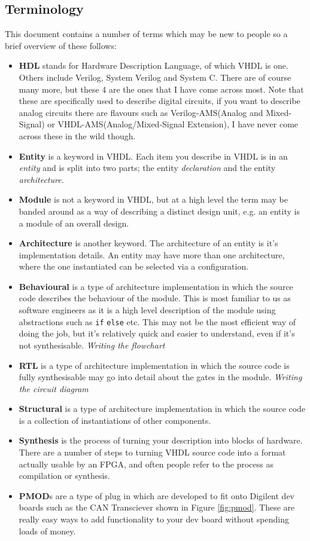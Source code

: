\documentclass[11pt,a4paper]{article}
\newlength\myheight
\newlength\mydepth
\newcommand*\inlinegraphics[1]{%
  \settototalheight\myheight{Xygp}%
  \settodepth\mydepth{Xygp}%
  \raisebox{-\mydepth}{\texttt{[image: \#1]}}%
}
\newcommand{\handwaving}{\inlinegraphics{./src/hand.png}}
\begin{document}
\subsection{Terminology}
This document contains a number of terms which may be new to people so a brief overview of these follows:
\begin{itemize}
    \item \textbf{HDL} stands for Hardware Description Language, of which VHDL is one. Others include Verilog, System Verilog and System C. There are of course many more, but these 4 are the ones that I have come across most. Note that these are specifically used to describe digital circuits, if you want to describe analog circuits there are flavours such as Verilog-AMS(Analog and Mixed-Signal) or VHDL-AMS(Analog/Mixed-Signal Extension), I have never come across these in the wild though.
    \item \textbf{Entity} is a keyword in VHDL. Each item you describe in VHDL is in an \emph{entity} and is split into two parts; the entity \emph{declaration} and the entity \emph{architecture}.
    \item \textbf{Module} is not a keyword in VHDL, but at a high level the term may be banded around as a way of describing a distinct design unit, e.g. an entity is a module of an overall design.
    \item \textbf{Architecture} is another keyword. The architecture of an entity is it's implementation details. An entity may have more than one architecture, where the one instantiated can be selected via a configuration.
    \item \textbf{Behavioural} is a type of architecture implementation in which the source code describes the behaviour of the module. This is most familiar to us as software engineers as it is a high level description of the module using abstractions such as \texttt{if} \texttt{else} etc. This may not be the most efficient way of doing the job, but it's relatively quick and easier to understand, even if it's not synthesisable. \emph{Writing the flowchart}
    \item \textbf{RTL} is a type of architecture implementation in which the source code is fully synthesisable may go into detail about the gates in the module. \emph{Writing the circuit diagram}
    \item \textbf{Structural} is a type of architecture implementation in which the source code is a collection of instantiations of other components. 
    \item \textbf{Synthesis} is the process of turning your description into blocks of hardware.\handwaving There are a number of steps to turning VHDL source code into a format actually usable by an FPGA, and often people refer to the process as compilation or synthesis. 
    \item \textbf{PMOD}s are a type of plug in which are developed to fit onto Digilent dev boards such as the CAN Transciever shown in Figure \cref{fig:pmod}. These are really easy ways to add functionality to your dev board without spending loads of money.
\end{itemize}
\end{document}
